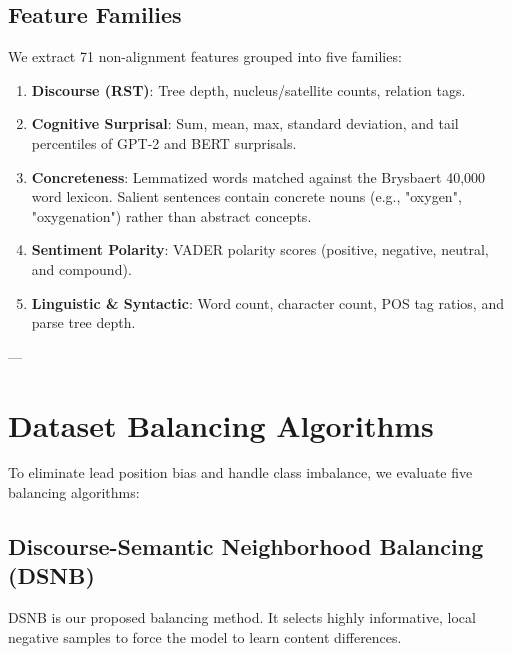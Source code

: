 \documentclass[11pt,a4paper]{article}
\begin{document}
\subsection{Feature Families}
We extract 71 non-alignment features grouped into five families:
\begin{enumerate}
    \item \textbf{Discourse (RST)}: Tree depth, nucleus/satellite counts, relation tags.
    \item \textbf{Cognitive Surprisal}: Sum, mean, max, standard deviation, and tail percentiles of GPT-2 and BERT surprisals.
    \item \textbf{Concreteness}: Lemmatized words matched against the Brysbaert 40,000 word lexicon. Salient sentences contain concrete nouns (e.g., "oxygen", "oxygenation") rather than abstract concepts.
    \item \textbf{Sentiment Polarity}: VADER polarity scores (positive, negative, neutral, and compound).
    \item \textbf{Linguistic \& Syntactic}: Word count, character count, POS tag ratios, and parse tree depth.
\end{enumerate}

---

\section{Dataset Balancing Algorithms}

To eliminate lead position bias and handle class imbalance, we evaluate five balancing algorithms:

\subsection{Discourse-Semantic Neighborhood Balancing (DSNB)}
DSNB is our proposed balancing method. It selects highly informative, local negative samples to force the model to learn content differences.
\end{document}
